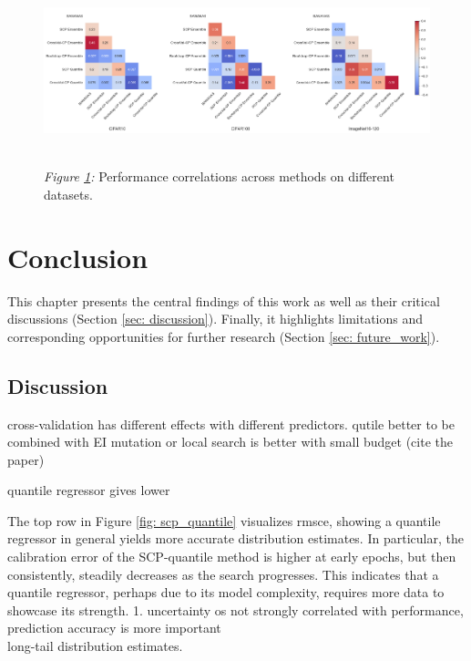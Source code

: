 \documentclass[a4paper,oneside,bibliography=totoc]{scrbook}
\begin{document}
	\vspace{0.7em}
	\begin{figure}[htbp]
		\centering
		\includegraphics[scale=0.37 ]{figs/val_acc_correlation_per_dataset.png}
		\label{fig: corr}
		\\
 		\vspace{1em}
  		{\small \textit{Figure \ref{fig: corr}:} Performance correlations across methods on different datasets.}	
	\end{figure}


\chapter{Conclusion}
This chapter presents the central findings of this work as well as their critical discussions (Section \ref{sec: discussion}). Finally, it highlights limitations and corresponding opportunities for further research (Section \ref{sec: future_work}).

\section{Discussion}
cross-validation has different effects with different predictors.
qutile better to be combined with EI
mutation or local search is better with small budget (cite the paper)
\label{sec: discussion}

quantile regressor gives lower

 	The top row in Figure \ref{fig: scp_quantile} visualizes \gls{rmsce}, showing a quantile regressor in general yields more accurate distribution estimates. In particular, the calibration error of the SCP-quantile method is higher at early epochs, but then consistently, steadily decreases as the search progresses. This indicates that a quantile regressor, perhaps due to its model complexity, requires more data to showcase its strength.
1.  uncertainty os not strongly correlated with performance, prediction accuracy is more important \\long-tail distribution estimates.
\end{document}
